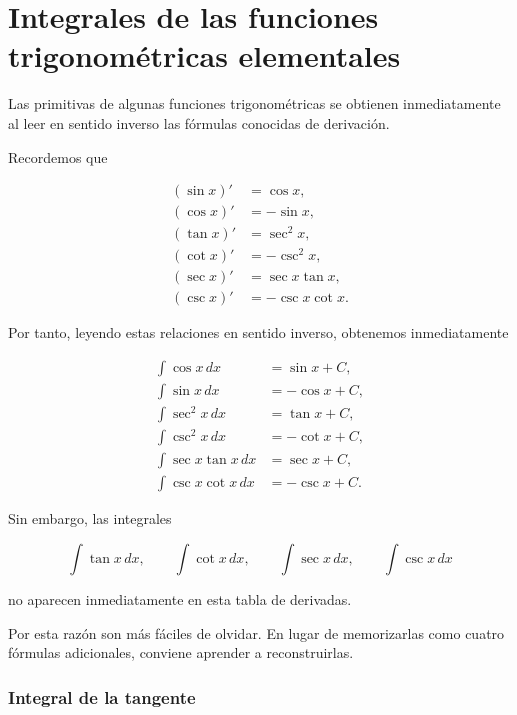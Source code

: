 \documentclass[12pt]{article}
\theoremstyle{definition}
\theoremstyle{remark}
\begin{document}
\section{Integrales de las funciones trigonométricas elementales}

Las primitivas de algunas funciones trigonométricas se obtienen
inmediatamente al leer en sentido inverso las fórmulas conocidas
de derivación.

Recordemos que

\[
\boxed{
\begin{aligned}
(\sin x)'&=\cos x,\\
(\cos x)'&=-\sin x,\\
(\tan x)'&=\sec^2x,\\
(\cot x)'&=-\csc^2x,\\
(\sec x)'&=\sec x\tan x,\\
(\csc x)'&=-\csc x\cot x.
\end{aligned}}
\]

Por tanto, leyendo estas relaciones en sentido inverso, obtenemos
inmediatamente

\[
\boxed{
\begin{aligned}
\int \cos x\,dx
    &=\sin x+C,\\[1mm]
\int \sin x\,dx
    &=-\cos x+C,\\[1mm]
\int \sec^2x\,dx
    &=\tan x+C,\\[1mm]
\int \csc^2x\,dx
    &=-\cot x+C,\\[1mm]
\int \sec x\tan x\,dx
    &=\sec x+C,\\[1mm]
\int \csc x\cot x\,dx
    &=-\csc x+C.
\end{aligned}}
\]

Sin embargo, las integrales

\[
\int\tan x\,dx,\qquad
\int\cot x\,dx,\qquad
\int\sec x\,dx,\qquad
\int\csc x\,dx
\]

no aparecen inmediatamente en esta tabla de derivadas.

Por esta razón son más fáciles de olvidar. En lugar de
memorizarlas como cuatro fórmulas adicionales, conviene aprender
a reconstruirlas.

\subsubsection*{Integral de la tangente}
\end{document}
